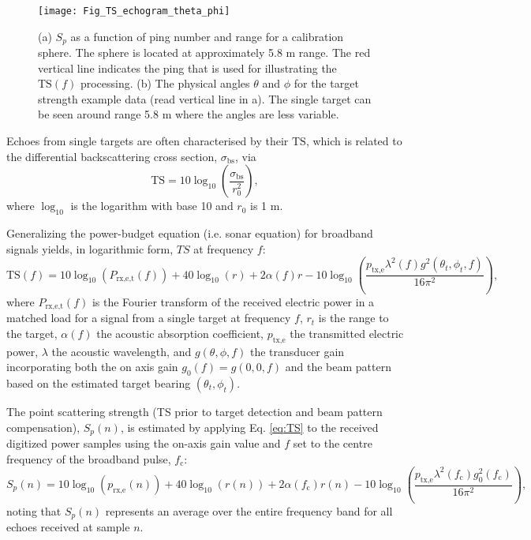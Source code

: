 \documentclass[preprint,12pt,TurnOnLineNumbers]{JASAnew}
\newcommand{\freqsym}{f}
\newcommand{\samplesymt}{n}
\newcommand{\fc}{f_{\textrm{c}}}
\newcommand{\ptxe}{p_{\textrm{tx,e}}}
\newcommand{\prxe}{p_{\textrm{rx,e}}}
\newcommand{\prxetf}{P_{\textrm{rx,e,t}}}
\newcommand{\bs}{\sigma_{\textrm{bs}}}
\newcommand{\mysp}{S_p}
\newcommand{\ts}{\textrm{TS}}
\newcommand{\range}{r}
\newcommand{\rangeref}{r_0}
\newcommand{\athw}{\phi}
\newcommand{\along}{\theta}
\newcommand{\gain}{g}
\newcommand{\gainzero}{g_0}
\newcommand{\wlen}{\lambda}
\newcommand{\absorp}{\alpha}
\begin{document}
\begin{figure}
\texttt{[image: Fig\_TS\_echogram\_theta\_phi]}
\caption{\label{fi:ts_theta_phi} (a) $\mysp$ as a function of ping number and range for a calibration sphere. The sphere is located at approximately 5.8 m range. The red vertical line indicates the ping that is used for illustrating the $\ts(\freqsym)$ processing. (b) The physical angles $\along$ and $\athw$ for the target strength example data (read vertical line in a). The single target can be seen around range 5.8 m where the angles are less variable.}
\end{figure}

Echoes from single targets are often characterised by their $\ts$, which is related to the differential backscattering cross section, $\bs$, via
%
\begin{equation}
\label{eq:TS_bs}
\ts = 10\log_{10}\left(\frac{\bs}{\rangeref^2}\right),
\end{equation}
%
where $\log_{10}$ is the logarithm with base 10 and $\rangeref$ is 1 m.

Generalizing the power-budget equation (i.e. sonar equation) for broadband signals \citep{lunde2016} yields, in logarithmic form, $TS$ at frequency $\freqsym$:
%
\begin{equation}
\label{eq:TS}
\ts(\freqsym) = 10\log_{10}(\prxetf(\freqsym)) + 40\log_{10}(\range) + 2\absorp(\freqsym) \range 
- 10\log_{10}\left( \frac{\ptxe \wlen^2(\freqsym) \gain^2(\along_t,\athw_t,\freqsym)}{16\pi^2} \right),
\end{equation}
%
where $\prxetf(\freqsym)$ is the Fourier transform of the received electric power in a matched load for a signal from a single target at frequency $\freqsym$, $\range_t$ is the range to the target, $\absorp(\freqsym)$ the acoustic absorption coefficient, $\ptxe$ the transmitted electric power, $\wlen$ the acoustic wavelength, and $\gain(\along,\athw,\freqsym)$ the transducer gain incorporating both the on axis gain $\gain_0(\freqsym)=\gain(0,0,\freqsym)$ and the beam pattern based on the estimated target bearing $(\along_t,\athw_t)$.

The point scattering strength (TS prior to target detection and beam pattern compensation), $\mysp(\samplesymt)$, is estimated by applying Eq. \ref{eq:TS} to the received digitized power samples using the on-axis gain value and $f$ set to the centre frequency of the broadband pulse, $\fc$: 
\begin{equation}
\label{eq:Sp}
\mysp(\samplesymt) = 10\log_{10}(\prxe(\samplesymt)) + 40\log_{10}(\range(\samplesymt)) 
+ 2\absorp(\fc) \range(\samplesymt) - 10\log_{10}\left( \frac{\ptxe \wlen^2(\fc) \gainzero^2(\fc)}{16\pi^2} \right),
\end{equation}
%
noting that $\mysp(\samplesymt)$ represents an average over the entire frequency band for all echoes received at sample $\samplesymt$.
\end{document}
